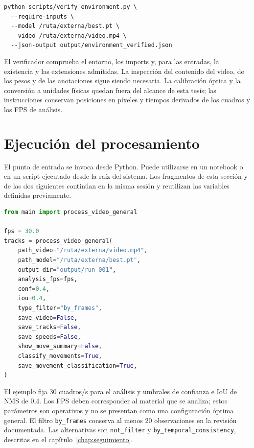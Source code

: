 \noindent\begin{minipage}{\linewidth}
\begin{lstlisting}[style=thesiscode]
python scripts/verify_environment.py \
  --require-inputs \
  --model /ruta/externa/best.pt \
  --video /ruta/externa/video.mp4 \
  --json-output output/environment_verified.json
\end{lstlisting}
\end{minipage}\par

El verificador comprueba el entorno, los imports y, para las entradas, la existencia y las extensiones admitidas. La inspección del contenido del video, de los pesos y de las anotaciones sigue siendo necesaria. La calibración óptica y la conversión a unidades físicas quedan fuera del alcance de esta tesis; las instrucciones conservan posiciones en píxeles y tiempos derivados de los cuadros y los FPS de análisis.

\section{Ejecución del procesamiento}

El punto de entrada se invoca desde Python. Puede utilizarse en un notebook o en un script ejecutado desde la raíz del sistema. Los fragmentos de esta sección y de las dos siguientes continúan en la misma sesión y reutilizan las variables definidas previamente.

\noindent\begin{minipage}{\linewidth}
\begin{lstlisting}[style=thesiscode,language=Python]
from main import process_video_general

fps = 30.0
tracks = process_video_general(
    path_video="/ruta/externa/video.mp4",
    path_model="/ruta/externa/best.pt",
    output_dir="output/run_001",
    analysis_fps=fps,
    conf=0.4,
    iou=0.4,
    type_filter="by_frames",
    save_video=False,
    save_tracks=False,
    save_speeds=False,
    show_move_summary=False,
    classify_movements=True,
    save_movement_classification=True,
)
\end{lstlisting}
\end{minipage}\par

El ejemplo fija 30 cuadros/s para el análisis y umbrales de confianza e IoU de NMS de 0,4. Los FPS deben corresponder al material que se analiza; estos parámetros son operativos y no se presentan como una configuración óptima general. El filtro \verb|by_frames| conserva al menos 20 observaciones en la revisión documentada. Las alternativas son \verb|not_filter| y \verb|by_temporal_consistency|, descritas en el capítulo~\ref{chap:seguimiento}.

